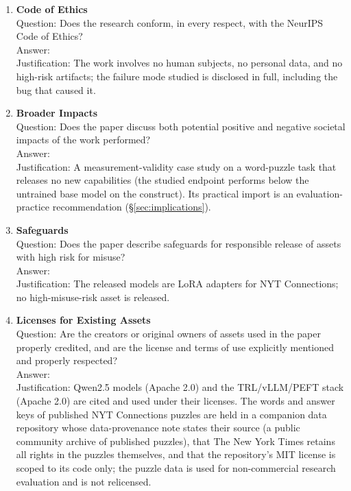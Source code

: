 \documentclass{article}
\begin{document}
\begin{enumerate}
\item \textbf{Code of Ethics}\\
Question: Does the research conform, in every respect, with the NeurIPS Code
of Ethics?\\
Answer: \answerYes{}\\
Justification: The work involves no human subjects, no personal data, and no
high-risk artifacts; the failure mode studied is disclosed in full, including
the bug that caused it.

\item \textbf{Broader Impacts}\\
Question: Does the paper discuss both potential positive and negative societal
impacts of the work performed?\\
Answer: \answerNA{}\\
Justification: A measurement-validity case study on a word-puzzle task that
releases no new capabilities (the studied endpoint performs below the
untrained base model on the construct). Its practical import is an
evaluation-practice recommendation (\S\ref{sec:implications}).

\item \textbf{Safeguards}\\
Question: Does the paper describe safeguards for responsible release of assets
with high risk for misuse?\\
Answer: \answerNA{}\\
Justification: The released models are LoRA adapters for NYT Connections; no
high-misuse-risk asset is released.

\item \textbf{Licenses for Existing Assets}\\
Question: Are the creators or original owners of assets used in the paper
properly credited, and are the license and terms of use explicitly mentioned
and properly respected?\\
Answer: \answerYes{}\\
Justification: Qwen2.5 models (Apache 2.0) and the TRL/vLLM/PEFT stack
(Apache 2.0) are cited and used under their licenses. The words and answer
keys of published NYT Connections puzzles are held in a companion data
repository whose data-provenance note states their source (a public
community archive of published puzzles), that The New York Times retains
all rights in the puzzles themselves, and that the repository's MIT license
is scoped to its code only; the puzzle data is used for non-commercial
research evaluation and is not relicensed.


\end{enumerate}
\end{document}
